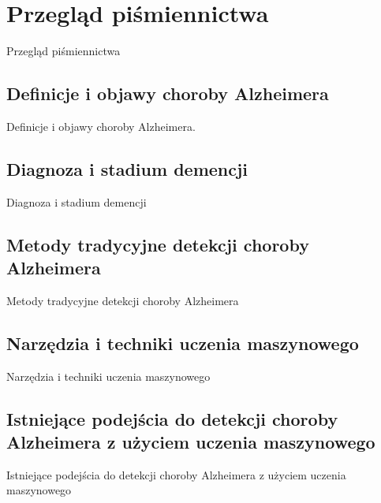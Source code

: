 \chapter{Przegląd piśmiennictwa}

Przegląd piśmiennictwa

\section{Definicje i objawy choroby Alzheimera}

Definicje i objawy choroby Alzheimera.

\section{Diagnoza i stadium demencji}

Diagnoza i stadium demencji

\section{Metody tradycyjne detekcji choroby Alzheimera}

Metody tradycyjne detekcji choroby Alzheimera

\section{Narzędzia i techniki uczenia maszynowego}

Narzędzia i techniki uczenia maszynowego

\section{Istniejące podejścia do detekcji choroby Alzheimera z użyciem uczenia maszynowego}

Istniejące podejścia do detekcji choroby Alzheimera z użyciem uczenia maszynowego
